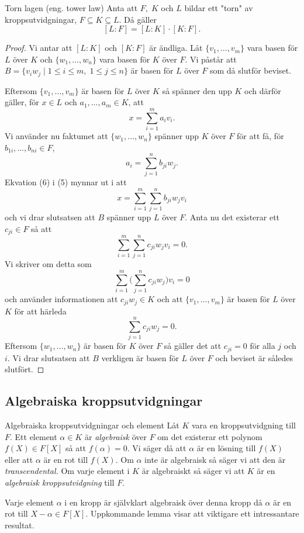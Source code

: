 \documentclass{article}
\theoremstyle{definition}
\begin{document}
\hypertarget{torn lagen}{}
\begin{mytheo}{Torn lagen (eng. tower law)}{}
  Anta att $F, \; K$ och $L$ bildar ett "torn" av kroppsutvidgningar, $F \subseteq K \subseteq L$. Då gäller
  \[ [L:F] = [L:K] \cdot [K:F]. \]
\end{mytheo}
\begin{proof}
  Vi antar att $[L:K]$ och $[K:F]$ är ändliga. Låt $\{v_1, \ldots, v_m\}$ vara basen för $L$ över $K$ och $\{w_1, \ldots, w_n\}$ vara basen för $K$ över $F$.
  Vi påstår att $B = \{v_iw_j \; | \; 1 \leq i \leq m, \; 1 \leq j \leq n\}$ är basen för $L$ över $F$ som då slutför beviset.

  Eftersom $\{v_1, \ldots, v_m\}$ är basen för $L$ över $K$ så spänner den upp $K$ och därför gäller, för $x \in L$ och $a_1, \ldots, a_m \in K$, att 
  \begin{equation}
    x = \sum_{i = 1}^m a_i v_i.
  \end{equation}
  Vi använder nu faktumet att $\{w_1, \ldots, w_n\}$ spänner upp $K$ över $F$ för att få, för 
  \linebreak
  $b_{1i}, \ldots, b_{ni} \in F$,
  \begin{equation}
    a_i = \sum_{j = 1}^n b_{ji}w_j.
  \end{equation}
  Ekvation (6) i (5) mynnar ut i att
  \[x = \sum_{i = 1}^m \sum_{j = 1}^n b_{ji}w_jv_i\]
  och vi drar slutsatsen att $B$ spänner upp $L$ över $F$. Anta nu det existerar ett $c_{ji} \in F$ så att 
  \[\sum_{i = 1}^m \sum_{j = 1}^n c_{ji}w_jv_i = 0.\]
  Vi skriver om detta som 
  \[\sum_{i = 1}^m \biggl( \sum_{j = 1}^n c_{ji}w_j \biggl) v_i = 0\]
  och använder informationen att $c_{ji}w_j \in K$ och att $\{v_1, \ldots, v_m\}$ är basen för $L$ över $K$ för att härleda
  \[\sum_{j = 1}^n c_{ji}w_j = 0.\]
  Eftersom $\{w_1, \ldots, w_n\}$ är basen för $K$ över $F$ så gäller det att $c_{ji} = 0$ för alla $j$ och $i$. Vi drar slutsatsen att 
  $B$ verkligen är basen för $L$ över $F$ och beviset är således slutfört. 
\end{proof}

\subsection{Algebraiska kroppsutvidgningar}
\begin{mydef}{Algebraiska kroppsutvidgningar och element}{}
  Låt $K$ vara en kroppsutvidgning till $F$. Ett element $\alpha \in K$ är \textit{algebraisk} över $F$ om det existerar ett polynom $f(X) \in F[X]$ 
  så att $f(\alpha) = 0.$ Vi säger då att $\alpha$ är en lösning till $f(X)$ eller att $\alpha$ är en rot till $f(X).$ Om $\alpha$ inte är algebraisk så säger 
  vi att den är \textit{transcendental.}
  Om varje element i $K$ är algebraiskt så säger vi att $K$ är en \textit{algebraisk kroppsutvidgning} till $F$.
\end{mydef}
Varje element $\alpha$ i en kropp är självklart algebraisk över denna kropp då $\alpha$ är en rot till $X - \alpha \in F[X]$. Uppkommande lemma visar att 
viktigare ett intressantare resultat. 
\end{document}
